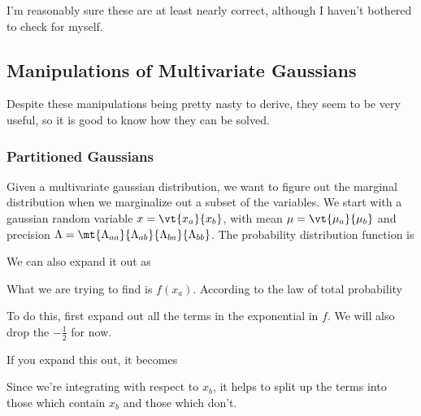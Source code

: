 \documentclass[12pt]{article}
\begin{document}
I'm reasonably sure these are at least nearly correct, although I haven't bothered to check for myself.

\subsection{Manipulations of Multivariate Gaussians}

Despite these manipulations being pretty nasty to derive, they seem to be very useful, so it is good to know how they can be solved. 

\subsubsection{Partitioned Gaussians}

Given a multivariate gaussian distribution, we want to figure out the marginal distribution when we marginalize out a subset of the variables. We start with a gaussian random variable $x = \vt{x_a}{x_b}$, with mean $\mu = \vt{\mu_a}{\mu_b}$ and precision $\Lambda = \mt{\Lambda_{aa}}{\Lambda_{ab}}{\Lambda_{ba}}{\Lambda_{bb}}$. The probability distribution function is


We can also expand it out as


What we are trying to find is $f(x_a)$. According to the law of total probability


To do this, first expand out all the terms in the exponential in $f$. We will also drop the $-\frac{1}{2}$ for now.


If you expand this out, it becomes


Since we're integrating with respect to $x_b$, it helps to split up the terms into those which contain $x_b$ and those which don't.
\end{document}
